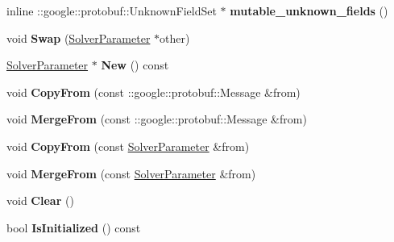 \begin{DoxyCompactItemize}
\mbox{\label{classcaffe_1_1_solver_parameter_a11f5d8d40e1d52ea3b09311afb84291d}} 
inline \+::google\+::protobuf\+::\+Unknown\+Field\+Set $\ast$ {\bfseries mutable\+\_\+unknown\+\_\+fields} ()
\item 
\mbox{\label{classcaffe_1_1_solver_parameter_a64ceedef33d70d99e0cb23f1a96f7128}} 
void {\bfseries Swap} (\mbox{\hyperlink{classcaffe_1_1_solver_parameter}{Solver\+Parameter}} $\ast$other)
\item 
\mbox{\label{classcaffe_1_1_solver_parameter_a4a7cee1d7e2ae5867d4d4af5068e52bd}} 
\mbox{\hyperlink{classcaffe_1_1_solver_parameter}{Solver\+Parameter}} $\ast$ {\bfseries New} () const
\item 
\mbox{\label{classcaffe_1_1_solver_parameter_aaf19baab4164373c2c978176134b123a}} 
void {\bfseries Copy\+From} (const \+::google\+::protobuf\+::\+Message \&from)
\item 
\mbox{\label{classcaffe_1_1_solver_parameter_a4609b21b4c91061360e642536b2afdd5}} 
void {\bfseries Merge\+From} (const \+::google\+::protobuf\+::\+Message \&from)
\item 
\mbox{\label{classcaffe_1_1_solver_parameter_acd2fd0b299e7efd8002dbd9d1283f73e}} 
void {\bfseries Copy\+From} (const \mbox{\hyperlink{classcaffe_1_1_solver_parameter}{Solver\+Parameter}} \&from)
\item 
\mbox{\label{classcaffe_1_1_solver_parameter_a2d0b2807ba8f02a6acbee864f3827c6b}} 
void {\bfseries Merge\+From} (const \mbox{\hyperlink{classcaffe_1_1_solver_parameter}{Solver\+Parameter}} \&from)
\item 
\mbox{\label{classcaffe_1_1_solver_parameter_a9731a70d11ad9cfd4872e6e8e562e9e1}} 
void {\bfseries Clear} ()
\item 
\mbox{\label{classcaffe_1_1_solver_parameter_a7838f937caac04de9cfe218ed9667789}} 
bool {\bfseries Is\+Initialized} () const
\item 

\end{DoxyCompactItemize}
